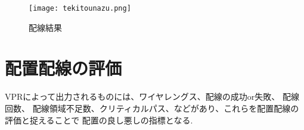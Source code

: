 \documentclass[uplatex]{jsarticle}
\begin{document}
    \begin{figure}[htbp]
        \begin{center}
            \texttt{[image: tekitounazu.png]}
            \caption{配線結果}
            \label{fig1}
        \end{center}
    \end{figure}
    \section{配置配線の評価}
        VPRによって出力されるものには、ワイヤレングス、配線の成功or失敗、 配線回数、
        配線領域不足数、クリティカルパス、などがあり、これらを配置配線の評価と捉えることで
        配置の良し悪しの指標となる.






\end{document}
